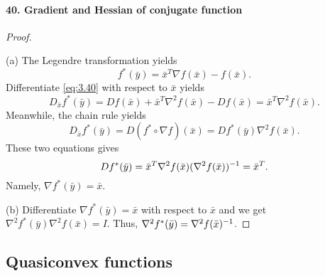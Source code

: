  \paragraph{40. Gradient and Hessian of conjugate function}
  \begin{proof}
    $\,$\par
    (a) The Legendre transformation yields
    \begin{equation}
      \label{eq:3.40}
      f^*(\bar{y})=\bar{x}^T\nabla f(\bar{x})-f(\bar{x}).
    \end{equation}
    Differentiate \eqref{eq:3.40} with respect to $\bar{x}$ yields
    \[
      D_{\bar{x}}f^*(\bar{y})=
      Df(\bar{x})+\bar{x}^T\nabla^2f(\bar{x})-Df(\bar{x})=
      \bar{x}^T\nabla^2f(\bar{x}).
    \]
    Meanwhile, the chain rule yields
    \[
      D_{\bar{x}}f^*(\bar{y})=
      D(f^*\circ\nabla f)(\bar{x})=
      Df^*(\bar{y})\nabla^2f(\bar{x}).
    \]
    These two equations gives
    \[
      Df^*(\bar{y})=\bar{x}^T\nabla^2f(\bar{x})(\nabla^2f(\bar{x}))^{-1}=
      \bar{x}^T.
    \]
    Namely, $\nabla f^*(\bar{y})=\bar{x}$.\par
    (b) Differentiate $\nabla f^*(\bar{y})=\bar{x}$ with respect to $\bar{x}$
    and we get $\nabla^2f^*(\bar{y})\nabla^2f(\bar{x})=I$. Thus, $\nabla^2f^*
    (\bar{y})=\nabla^2f(\bar{x})^{-1}$.
  \end{proof}
\subsection{Quasiconvex functions}
